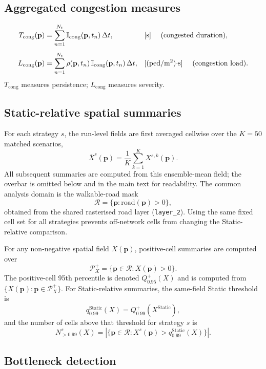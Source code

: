 \documentclass[preprint,12pt]{elsarticle}
\providecommand{\FloatBarrier}{}
\let\origsubsection\subsection
\renewcommand{\subsection}{\FloatBarrier\origsubsection}
\begin{document}
\subsection{Aggregated congestion measures}

\begin{align}
T_{\mathrm{cong}}(\mathbf{p})
  &= \sum_{n=1}^{N_t}
     \mathbb{I}_{\mathrm{cong}}(\mathbf{p}, t_n)\, \Delta t,
  && \text{[s] \quad (congested duration)}, \\[4pt]
L_{\mathrm{cong}}(\mathbf{p})
  &= \sum_{n=1}^{N_t}
     \rho(\mathbf{p}, t_n)\,
     \mathbb{I}_{\mathrm{cong}}(\mathbf{p}, t_n)\, \Delta t,
  && \text{[(ped/m$^2$)$\cdot$s] \quad (congestion load)}.
\end{align}
$T_{\mathrm{cong}}$ measures persistence; $L_{\mathrm{cong}}$ measures
severity.

\subsection{Static-relative spatial summaries}

For each strategy $s$, the run-level fields are first averaged cellwise over
the $K=50$ matched scenarios,
\[
\overline{X}^{s}(\mathbf{p})
=\frac{1}{K}\sum_{k=1}^{K}X^{s,k}(\mathbf{p}).
\]
All subsequent summaries are computed from this ensemble-mean field; the
overbar is omitted below and in the main text for readability. The common
analysis domain is the walkable-road mask
\[
\mathcal{R}=\{\mathbf{p}:\mathrm{road}(\mathbf{p})>0\},
\]
obtained from the shared rasterised road layer (\texttt{layer\_2}). Using the
same fixed cell set for all strategies prevents off-network cells from
changing the Static-relative comparison.

For any non-negative spatial field $X(\mathbf{p})$, positive-cell
summaries are computed over
\[
\mathcal{P}^{+}_{X}=\{\mathbf{p}\in\mathcal{R}: X(\mathbf{p})>0\}.
\]
The positive-cell 95th percentile is denoted
$Q^{+}_{0.95}(X)$ and is computed from
$\{X(\mathbf{p}):\mathbf{p}\in\mathcal{P}^{+}_{X}\}$. For
Static-relative summaries, the same-field Static threshold is
\[
q^{\mathrm{Static}}_{0.99}(X)
= Q^{+}_{0.99}\!\left(X^{\mathrm{Static}}\right),
\]
and the number of cells above that threshold for strategy $s$ is
\[
N^{s}_{>0.99}(X)
=
\left|\{\mathbf{p}\in\mathcal{R}: X^{s}(\mathbf{p})
> q^{\mathrm{Static}}_{0.99}(X)\}\right|.
\]

\subsection{Bottleneck detection}
\end{document}
